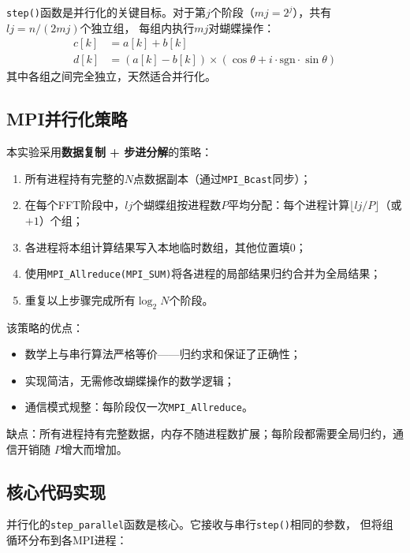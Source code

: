 \documentclass[UTF8,a4paper,12pt,fontset=none]{ctexart}
\begin{document}
\texttt{step()}函数是并行化的关键目标。对于第$j$个阶段（$mj=2^j$），共有$lj = n/(2mj)$个独立组，
每组内执行$mj$对蝴蝶操作：
\[
\begin{aligned}
c[k] &= a[k] + b[k] \\
d[k] &= (a[k] - b[k]) \times (\cos\theta + i \cdot \text{sgn} \cdot \sin\theta)
\end{aligned}
\]
其中各组之间完全独立，天然适合并行化。

\subsection{MPI并行化策略}

本实验采用\textbf{数据复制 + 步进分解}的策略：

\begin{enumerate}[leftmargin=2.2em]
  \item 所有进程持有完整的$N$点数据副本（通过\texttt{MPI\_Bcast}同步）；
  \item 在每个FFT阶段中，$lj$个蝴蝶组按进程数$P$平均分配：每个进程计算$\lfloor lj/P \rfloor$（或$+1$）个组；
  \item 各进程将本组计算结果写入本地临时数组，其他位置填0；
  \item 使用\texttt{MPI\_Allreduce(MPI\_SUM)}将各进程的局部结果归约合并为全局结果；
  \item 重复以上步骤完成所有$\log_2 N$个阶段。
\end{enumerate}

该策略的优点：
\begin{itemize}[leftmargin=2.2em]
  \item 数学上与串行算法严格等价——归约求和保证了正确性；
  \item 实现简洁，无需修改蝴蝶操作的数学逻辑；
  \item 通信模式规整：每阶段仅一次\texttt{MPI\_Allreduce}。
\end{itemize}

缺点：所有进程持有完整数据，内存不随进程数扩展；每阶段都需要全局归约，通信开销随
$P$增大而增加。

\subsection{核心代码实现}

并行化的\texttt{step\_parallel}函数是核心。它接收与串行\texttt{step()}相同的参数，
但将组循环分布到各MPI进程：
\end{document}
